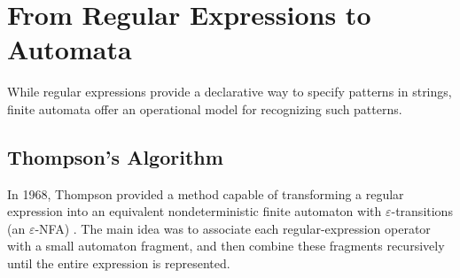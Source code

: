 %

\section{From Regular Expressions to Automata}
While regular expressions provide a declarative way to specify patterns in strings, finite automata offer an operational model for recognizing such patterns.



\subsection{Thompson's Algorithm}

In 1968, Thompson provided a method capable of transforming a regular expression into an equivalent nondeterministic finite automaton with $\varepsilon$-transitions (an $\varepsilon$-NFA) \cite{thompson_re2nfa}. The main idea was to associate each regular-expression operator with a small automaton fragment, and then combine these fragments recursively until the entire expression is represented.

